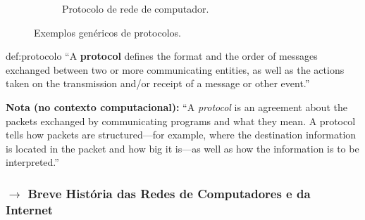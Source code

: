 \begin{figure}[H]
\begin{subfigure}[b]{0.5\linewidth}
{\begin{msc}
                \nextlevel[2]
                \nextlevel[2]
                \nextlevel[2]
            \end{msc}
        }
        \caption{Protocolo de rede de computador\protect\footnotemark[1].}
        \label{subfig:protocol-example2}
    \end{subfigure}%
    \label{fig:exemplos-protocolos}
    \caption{Exemplos genéricos de protocolos.}
\end{figure}

\vspace{-1em}
\begin{theo}{def:protocolo}\label{def:protocolo}
    ``A \textbf{protocol} defines the format and the order of messages exchanged between two or more communicating entities, as well as the actions taken on the transmission and/or receipt of a message or other event.''\cite{Kurose2017}
\end{theo}

\noindent \textbf{Nota (no contexto computacional):} ``A \textit{protocol} is an agreement about the packets exchanged by communicating programs and what they mean. A protocol tells how packets are structured---for example, where the destination information is located in the packet and how big it is---as well as how the information is to be interpreted.''\cite{Donahoo-Kenneth2002}

\subsubsection[1.1.3 Breve História das Redes de Computadores e da Internet]{$\pmb{\rightarrow}$ Breve História das Redes de Computadores e da Internet}

